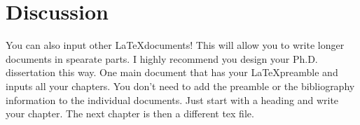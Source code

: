\documentclass{article}
\begin{document}
\newpage
\section{Discussion}
\label{sec:discussion}

You can also input other \LaTeX documents! This will allow you to write longer documents in spearate parts. I highly recommend you design your Ph.D. dissertation this way. One main document that has your \LaTeX preamble and inputs all your chapters. You don't need to add the preamble or the bibliography information to the individual documents. Just start with a heading and write your chapter. The next chapter is then a different tex file.







\newpage


\end{document}
